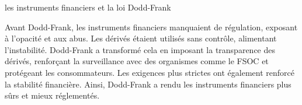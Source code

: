 \begin{frame}{les instruments financiers et la loi Dodd-Frank }


Avant Dodd-Frank, les instruments financiers manquaient de régulation, exposant à l'opacité et aux abus. Les dérivés étaient utilisés sans contrôle, alimentant l'instabilité. Dodd-Frank a transformé cela en imposant la transparence des dérivés, renforçant la surveillance avec des organismes comme le FSOC et protégeant les consommateurs. Les exigences plus strictes ont également renforcé la stabilité financière. Ainsi, Dodd-Frank a rendu les instruments financiers plus sûrs et mieux réglementés.
\end{frame}